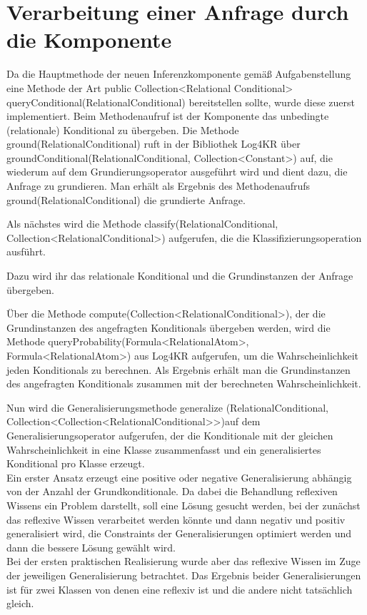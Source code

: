 \documentclass[a4paper, 11pt]{book}
\begin{document}
{\section{Verarbeitung einer Anfrage durch die Komponente}
Da die Hauptmethode der neuen Inferenzkomponente gemäß Aufgabenstellung eine Methode der Art public Collection<Relational Conditional> queryConditional(RelationalConditional) bereitstellen sollte, wurde diese zuerst  implementiert. Beim Methodenaufruf ist der Komponente das unbedingte (relationale) Konditional zu übergeben.
Die Methode ground(RelationalConditional) ruft in der Bibliothek Log4KR über groundConditional(RelationalConditional, Collection<Constant>) auf, die wiederum auf dem Grundierungsoperator ausgeführt wird und dient dazu, die Anfrage zu grundieren. Man erhält als Ergebnis des Methodenaufrufs ground(RelationalConditional) die grundierte Anfrage.

Als nächstes wird die Methode classify(RelationalConditional, Collection<RelationalConditional>) aufgerufen, die die Klassifizierungsoperation ausführt.

Dazu wird ihr das relationale Konditional und die Grundinstanzen der Anfrage übergeben.

Über die Methode compute(Collection<RelationalConditional>), der die Grundinstanzen des angefragten Konditionals übergeben werden, wird die Methode queryProbability(Formula<RelationalAtom>, Formula<RelationalAtom>) aus Log4KR aufgerufen, um die Wahrscheinlichkeit jeden Konditionals zu berechnen. Als Ergebnis erhält man die Grundinstanzen des angefragten Konditionals zusammen mit der berechneten Wahrscheinlichkeit.

Nun wird die Generalisierungsmethode generalize (RelationalConditional, Collection<Collection<RelationalConditional>>)auf dem  Generalisierungsoperator aufgerufen, der die Konditionale mit der gleichen Wahrscheinlichkeit in eine Klasse zusammenfasst und ein generalisiertes Konditional pro Klasse erzeugt.\\
Ein erster Ansatz erzeugt eine positive oder negative Generalisierung abhängig von der Anzahl der Grundkonditionale. Da dabei die Behandlung reflexiven Wissens ein Problem darstellt, soll eine Lösung gesucht werden, bei der zunächst das reflexive Wissen verarbeitet werden könnte und dann negativ und positiv generalisiert wird, die Constraints der Generalisierungen optimiert werden und dann die bessere Lösung gewählt wird. \\
Bei der ersten praktischen Realisierung wurde aber das reflexive Wissen im Zuge der jeweiligen Generalisierung betrachtet. Das Ergebnis beider Generalisierungen ist für zwei Klassen von denen eine reflexiv ist und die andere nicht tatsächlich gleich.\\

}
\end{document}
